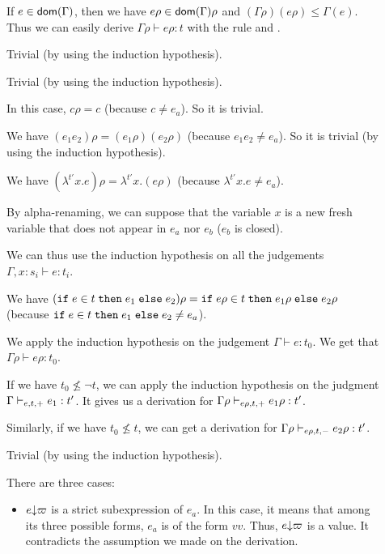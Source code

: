 \documentclass[a4paper]{article}
\theoremstyle{definition}
\begin{document}
        \begin{description}
          \item[] If $e\in\dom\Gamma$, then we have $e\rho\in\dom\Gamma\rho$ and $(\Gamma\rho)(e\rho)\leq\Gamma(e)$.
          Thus we can easily derive $\Gamma\rho\vdash e\rho:t$ with the rule  and .
          \item[] Trivial (by using the induction hypothesis).
          \item[] Trivial (by using the induction hypothesis).
          \item[] In this case, $c\rho = c$ (because $c \neq e_a$). So it is trivial.
          \item[] We have $(e_1 e_2)\rho = (e_1\rho) (e_2\rho)$ (because $e_1 e_2 \neq e_a$).
          So it is trivial (by using the induction hypothesis).
          \item[] We have $(\lambda^{t'}x.e)\rho = \lambda^{t'}x.(e\rho)$ (because $\lambda^{t'}x.e \neq e_a$).
          
          By alpha-renaming, we can suppose that the variable $x$ is a new fresh variable that does not appear
          in $e_a$ nor $e_b$ ($e_b$ is closed).
          
          We can thus use the induction hypothesis on all the judgements $\Gamma, x:s_i \vdash e:t_i$.
          \item[]
          We have $(\ite e t {e_1} {e_2})\rho = \ite {e\rho} t {e_1\rho} {e_2\rho}$ (because $\ite e t {e_1} {e_2} \neq e_a$).

          We apply the induction hypothesis on the judgement $\Gamma\vdash e:t_0$.
          We get that $\Gamma\rho\vdash e\rho:t_0$.

          If we have $t_0\not\leq\neg t$, we can apply the induction hypothesis on the judgment $\Gamma\cvdash + e t e_1:t'$.
          It gives us a derivation for $\Gamma\rho\cvdash + {e\rho} t e_1\rho:t'$.

          Similarly, if we have $t_0\not\leq t$, we can get a derivation for $\Gamma\rho\cvdash - {e\rho} t e_2\rho:t'$.
          \item[] Trivial (by using the induction hypothesis).
          \item[] There are three cases:
          \begin{itemize}
            \item $\occ e \varpi$ is a strict subexpression of $e_a$. In this case, it means that among its three possible forms,
            $e_a$ is of the form $v v$. Thus, $\occ e \varpi$ is a value.
            It contradicts the assumption we made on the derivation.


\end{itemize}
\end{description}
\end{document}
